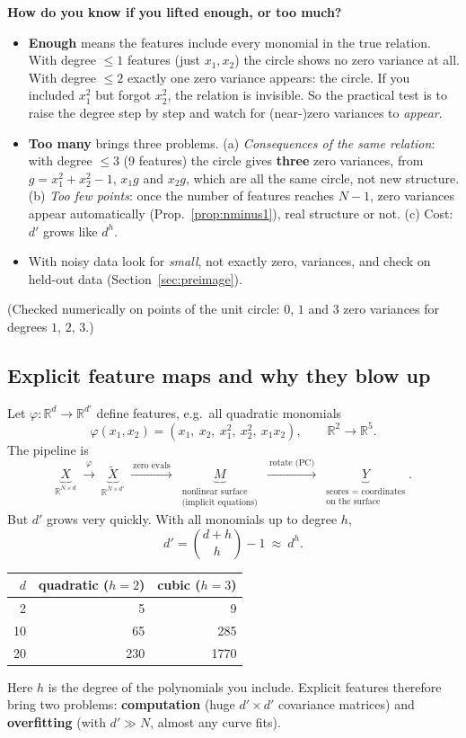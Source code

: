 \documentclass[11pt]{article}
\newcommand{\R}{\mathbb{R}}
\begin{document}
\begin{careful}
\textbf{How do you know if you lifted enough, or too much?}
\begin{itemize}[nosep]
\item \textbf{Enough} means the features include every monomial in the true relation. With degree $\le1$ features (just
$x_1,x_2$) the circle shows no zero variance at all. With degree $\le2$ exactly one zero variance appears: the circle. If
you included $x_1^2$ but forgot $x_2^2$, the relation is invisible. So the practical test is to raise the degree step
by step and watch for (near-)zero variances to \emph{appear}.
\item \textbf{Too many} brings three problems. (a) \emph{Consequences of the same relation}: with degree $\le3$ (9 features) the
circle gives \textbf{three} zero variances, from $g=x_1^2+x_2^2-1$, $x_1g$ and $x_2g$, which are all the same circle, not new
structure. (b) \emph{Too few points}: once the number of features reaches $N-1$, zero variances appear automatically
(Prop.~\ref{prop:nminus1}), real structure or not. (c) Cost: $d'$ grows like $d^h$.
\item With noisy data look for \emph{small}, not exactly zero, variances, and check on held-out data (Section~\ref{sec:preimage}).
\end{itemize}
(Checked numerically on points of the unit circle: $0$, $1$ and $3$ zero variances for degrees $1$, $2$, $3$.)
\end{careful}

\subsection{Explicit feature maps and why they blow up}

Let $\varphi:\R^d\to\R^{d'}$ define features, e.g.\ all quadratic monomials
\[
\varphi(x_1,x_2)=(x_1,\ x_2,\ x_1^2,\ x_2^2,\ x_1x_2),\qquad \R^2\to\R^5 .
\]
The pipeline is
\[
\underbrace{X}_{\R^{N\times d}}\ \xrightarrow{\ \varphi\ }\ \underbrace{\widetilde X}_{\R^{N\times d'}}
\ \xrightarrow{\ \text{zero evals}\ }\ \underbrace{M}_{\substack{\text{nonlinear surface}\\\text{(implicit equations)}}}
\ \xrightarrow{\ \text{rotate (PC)}\ }\ \underbrace{Y}_{\substack{\text{scores = coordinates}\\\text{on the surface}}} .
\]
But $d'$ grows very quickly. With all monomials up to degree $h$,
\[
d'=\binom{d+h}{h}-1\ \approx\ d^h .
\]
\begin{center}
\renewcommand{\arraystretch}{1.2}
\begin{tabular}{r|rr}
$d$ & quadratic ($h=2$) & cubic ($h=3$)\\\hline
2 & 5 & 9 \\
10 & 65 & 285 \\
20 & 230 & 1770
\end{tabular}
\end{center}
Here $h$ is the degree of the polynomials you include. Explicit features therefore bring
two problems: \textbf{computation} (huge $d'\times d'$ covariance matrices) and
\textbf{overfitting} (with $d'\gg N$, almost any curve fits).
\end{document}
